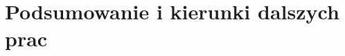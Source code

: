 \chapter{Podsumowanie i kierunki dalszych prac}
\label{cha:Podsumowanie i kierunki dalszych prac}


